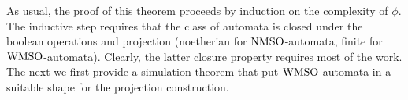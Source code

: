 As usual, the proof of this theorem proceeds by induction on the complexity of
$\phi$. The inductive step requires that the class of automata is closed under the boolean operations and projection (noetherian for $\mathrm{NMSO}$-automata, finite for $\mathrm{WMSO}$-automata). Clearly, the latter closure property requires most of the work. The next we first
provide a simulation theorem that put $\mathrm{WMSO}$-automata in a suitable shape
for the projection construction.


